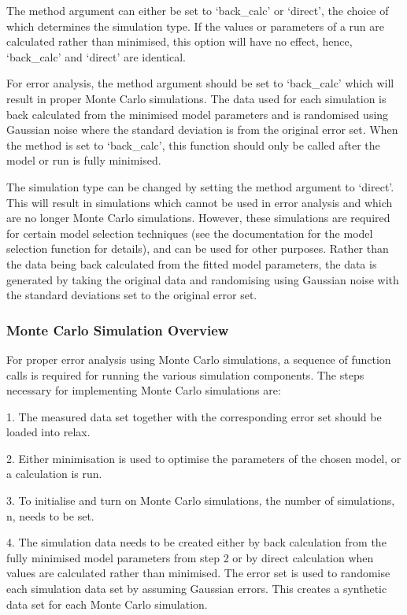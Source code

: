 The method argument can either be set to `back\_calc' or `direct', the choice of which
determines the simulation type.  If the values or parameters of a run are calculated rather
than minimised, this option will have no effect, hence, `back\_calc' and `direct' are
identical.

For error analysis, the method argument should be set to `back\_calc' which will result in
proper Monte Carlo simulations.  The data used for each simulation is back calculated from
the minimised model parameters and is randomised using Gaussian noise where the standard
deviation is from the original error set.  When the method is set to `back\_calc', this
function should only be called after the model or run is fully minimised.

The simulation type can be changed by setting the method argument to `direct'.  This will
result in simulations which cannot be used in error analysis and which are no longer Monte
Carlo simulations.  However, these simulations are required for certain model selection
techniques (see the documentation for the model selection function for details), and can be
used for other purposes.  Rather than the data being back calculated from the fitted model
parameters, the data is generated by taking the original data and randomising using Gaussian
noise with the standard deviations set to the original error set.



\subsubsection{Monte Carlo Simulation Overview}

For proper error analysis using Monte Carlo simulations, a sequence of function calls is
required for running the various simulation components.  The steps necessary for
implementing Monte Carlo simulations are:

1.  The measured data set together with the corresponding error set should be loaded into
relax.

2.  Either minimisation is used to optimise the parameters of the chosen model, or a
calculation is run.

3.  To initialise and turn on Monte Carlo simulations, the number of simulations, n, needs
to be set.

4.  The simulation data needs to be created either by back calculation from the fully
minimised model parameters from step 2 or by direct calculation when values are calculated
rather than minimised.  The error set is used to randomise each simulation data set by
assuming Gaussian errors.  This creates a synthetic data set for each Monte Carlo
simulation.


